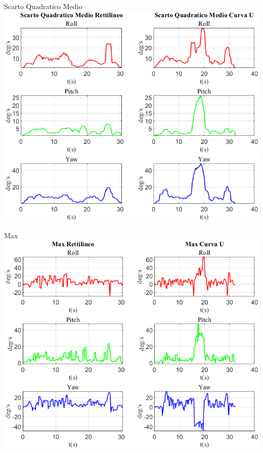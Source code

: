 \documentclass[beamer]{standalone}
\begin{document}
	\begin{frame}{{Scarto Quadratico Medio}}
		\centering\includegraphics[height=.8\textheight]{figure/VAng/Scarto Quadratico Medio}
	\end{frame}
	
	\begin{frame}{{Max}}
		\centering\includegraphics[height=.8\textheight]{figure/VAng/Max}
	\end{frame}
	
	
\end{document}

